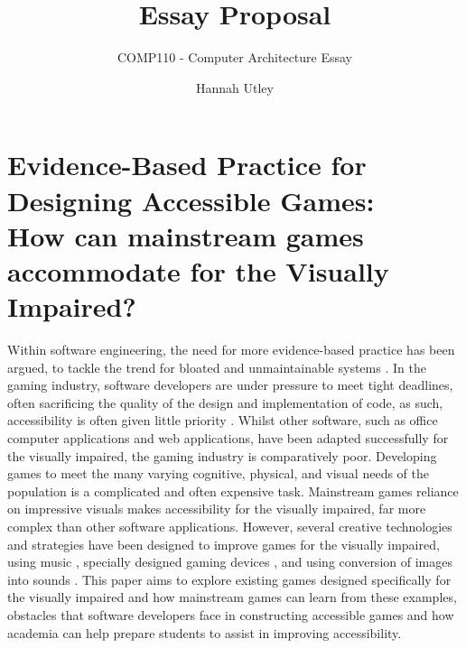 \documentclass{scrartcl}
\title{Essay Proposal}
\subtitle{COMP110 - Computer Architecture Essay}
\author{Hannah Utley}
\begin{document}
\maketitle

\section*{Evidence-Based Practice for Designing Accessible Games:\\
 How can mainstream games accommodate for the Visually Impaired?}

{Within software engineering, the need for more evidence-based practice has been argued, to tackle the trend for bloated and unmaintainable systems \cite{softwaredevelopers}. In the gaming industry, software developers are under pressure to meet tight deadlines, often sacrificing the quality of the design and implementation of code, as such, accessibility is often given little priority \cite{D.McPheron}. Whilst other software, such as office computer applications and web applications, have been adapted successfully for the visually impaired, the gaming industry is comparatively poor.  Developing games to meet the many varying cognitive, physical, and visual needs of the population is a complicated and often expensive task. Mainstream games reliance on impressive visuals makes accessibility for the visually impaired, far more complex than other software applications. However, several creative technologies and strategies have been designed to improve games for the visually impaired, using music \cite{Lotto}, specially designed gaming devices \cite{Ohtsuka}, and using conversion of images into sounds \cite{Marshall}. This paper aims to explore existing games designed specifically for the visually impaired and how mainstream games can learn from these examples, obstacles that software developers face in constructing accessible games and how academia can help prepare students to assist in improving accessibility.}
\end{document}
